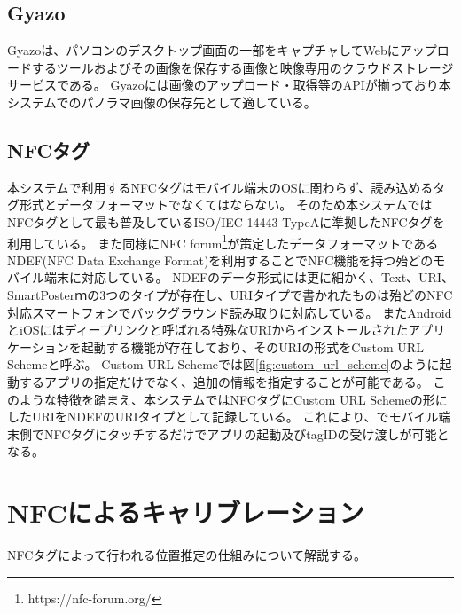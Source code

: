 \subsection{Gyazo}
Gyazoは、パソコンのデスクトップ画面の一部をキャプチャしてWebにアップロードするツールおよびその画像を保存する画像と映像専用のクラウドストレージサービスである。
Gyazoには画像のアップロード・取得等のAPIが揃っており本システムでのパノラマ画像の保存先として適している。

\subsection{NFCタグ}
本システムで利用するNFCタグはモバイル端末のOSに関わらず、読み込めるタグ形式とデータフォーマットでなくてはならない。
そのため本システムではNFCタグとして最も普及しているISO/IEC 14443 TypeAに準拠したNFCタグを利用している。
また同様にNFC forum\footnote{\textsf{https://nfc-forum.org/}}が策定したデータフォーマットであるNDEF(NFC Data Exchange Format)を利用することでNFC機能を持つ殆どのモバイル端末に対応している。
NDEFのデータ形式には更に細かく、Text、URI、SmartPosterｍの3つのタイプが存在し、URIタイプで書かれたものは殆どのNFC対応スマートフォンでバックグラウンド読み取りに対応している。
またAndroidとiOSにはディープリンクと呼ばれる特殊なURIからインストールされたアプリケーションを起動する機能が存在しており、そのURIの形式をCustom URL Schemeと呼ぶ。
Custom URL Schemeでは図\ref{fig:custom_url_scheme}のように起動するアプリの指定だけでなく、追加の情報を指定することが可能である。
このような特徴を踏まえ、本システムではNFCタグにCustom URL Schemeの形にしたURIをNDEFのURIタイプとして記録している。
これにより、でモバイル端末側でNFCタグにタッチするだけでアプリの起動及びtagIDの受け渡しが可能となる。


\section{NFCによるキャリブレーション}
NFCタグによって行われる位置推定の仕組みについて解説する。
